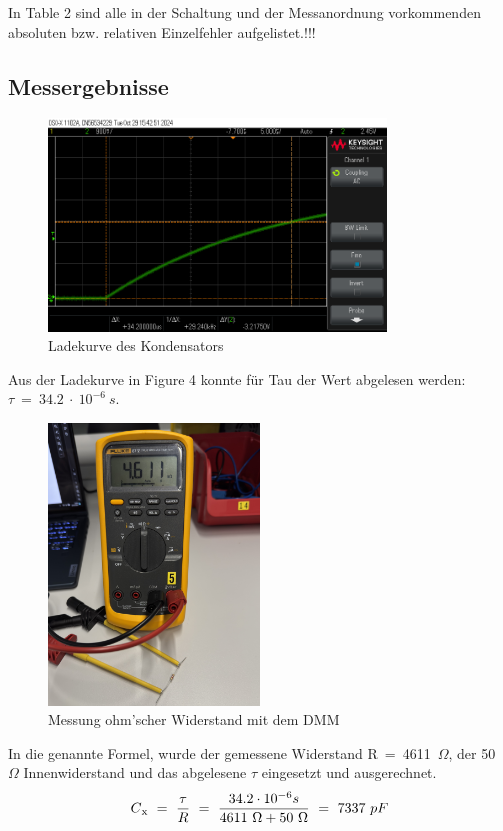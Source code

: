 \documentclass[a4paper,12pt]{article}
\begin{document}
\noindent In Table 2 sind alle in der Schaltung und der Messanordnung vorkommenden absoluten bzw. relativen Einzelfehler aufgelistet.!!!

\subsection{Messergebnisse}

\begin{figure}[H]
    \centering
    \includegraphics[width=0.8\textwidth]{../Quellen/Labor2/scope_1.png}
\caption{Ladekurve des Kondensators}
\end{figure}
Aus der Ladekurve in Figure 4 konnte für Tau der Wert abgelesen werden: \(\tau~=~34.2~\cdot~10^{-6}~s\).

\begin{figure}[H]
    \centering
    \includegraphics[width=0.5\textwidth]{../Quellen/Labor2/Fotos/IMG_3963gezoomt.jpeg}
\caption{Messung ohm'scher Widerstand mit dem DMM}
\end{figure}

In die genannte Formel, wurde der gemessene Widerstand R~=~4611~$\Omega$, der 50~$\Omega$ Innenwiderstand und das abgelesene $\tau$ eingesetzt und ausgerechnet.
\[
C\textsubscript{x} ~=~ \frac{\tau}{R} ~=~ \frac{34.2 \cdot 10^{-6}s}{4611~\Omega + 50~\Omega} ~=~ 7337~pF
\]
\end{document}
